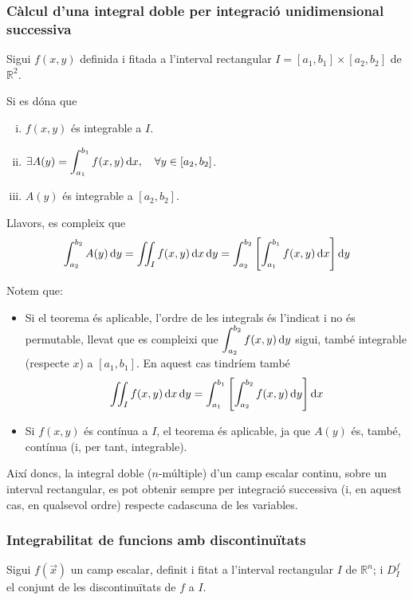 \subsubsection*{Càlcul d'una integral doble per integració unidimensional successiva}
\begin{thm}
	Sigui $f(x,y)$ definida i fitada a l'interval rectangular $I = [a_{1}, b_{1}] \times [a_{2}, b_{2}]$ de $\mathbb{R}^{2}$.

	Si es dóna que
	\begin{enumerate}[i)]
		\item $f(x,y)$ és integrable a $I$.
		\item $\displaystyle \exists A(y) = \int_{a_{1}}^{b_{1}} f(x,y) \mathop{}\!\mathrm{d} x, \quad \forall y \in [a_{2}, b_{2}]$.
		\item $A(y)$ és integrable a $[a_{2}, b_{2}]$.
	\end{enumerate}
	Llavors, es compleix que
	\begin{align}
		\int_{a_{2}}^{b_{2}} A(y) \mathop{}\!\mathrm{d} y = \iint_{I} f(x,y) \mathop{}\!\mathrm{d} x \mathop{}\!\mathrm{d} y = \int_{a_{2}}^{b_{2}} \left[ \int_{a_{1}}^{b_{1}} f(x,y) \mathop{}\!\mathrm{d} x \right] \mathop{}\!\mathrm{d} y
	\end{align}
\end{thm}
\newpage
Notem que:
\begin{itemize}
	\item Si el teorema és aplicable, l'ordre de les integrals és l'indicat i no és permutable, llevat que es compleixi que $\displaystyle \int_{a_{2}}^{b_{2}} f(x,y) \mathop{}\!\mathrm{d} y$ sigui, també integrable (respecte $x$) a $[a_{1}, b_{1}]$. En aquest cas tindríem també
		\begin{align}
		\iint_{I} f(x,y) \mathop{}\!\mathrm{d} x \mathop{}\!\mathrm{d} y = \int_{a_{1}}^{b_{1}} \left[ \int_{a_{2}}^{b_{2}} f(x,y) \mathop{}\!\mathrm{d} y \right] \mathop{}\!\mathrm{d} x
		\end{align}
	\item Si $f(x,y)$ és contínua a $I$, el teorema és aplicable, ja que $A(y)$ és, també, contínua (i, per tant, integrable).
\end{itemize}
\begin{cor}
	Així doncs, la integral doble ($n$-múltiple) d'un camp escalar continu, sobre un interval rectangular, es pot obtenir sempre per integració successiva (i, en aquest cas, en qualsevol ordre) respecte cadascuna de les variables.
\end{cor}

\subsubsection*{Integrabilitat de funcions amb discontinuïtats}
Sigui $f(\vec{x})$ un camp escalar, definit i fitat a l'interval rectangular $I$ de $\mathbb{R}^{n}$; i $D_{I}^{f}$ el conjunt de les discontinuïtats de $f$ a $I$.

